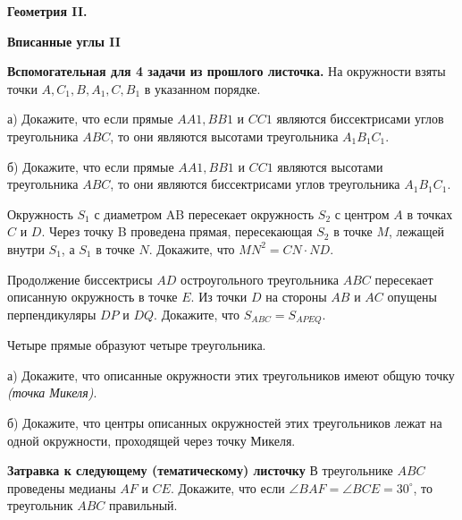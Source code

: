 \centerline{\bf \Huge Геометрия II.}
\centerline{\bf \Huge Вписанные углы II}

\begin{flushright}
        \scriptsize{}
\end{flushright}

\textbf{Вспомогательная для 4 задачи из прошлого листочка.}
На окружности взяты точки $A, C_1, B, A_1, C, B_1$ в указанном
порядке.

а) Докажите, что если прямые $AA1, BB1$ и $CC1$ являются биссектрисами углов треугольника $ABC$, то они являются высотами треугольника $A_1B_1C_1.$

б) Докажите, что если прямые $AA1, BB1$ и $CC1$ являются высотами
треугольника $ABC$, то они являются биссектрисами углов треугольника $A_1B_1C_1.$

Окружность $S_1$ с диаметром AB пересекает окружность $S_2$
с центром $A$ в точках $C$ и $D$. Через точку B проведена прямая,
пересекающая $S_2$ в точке $M$, лежащей внутри $S_1$, а $S_1$ в точке $N$.
Докажите, что $MN^2 = CN \cdot ND.$

Продолжение биссектрисы $AD$ остроугольного треугольника $ABC$ пересекает описанную окружность в точке $E$. Из точки $D$ на стороны $AB$ и $AC$ опущены перпендикуляры $DP$ и $DQ$. Докажите, что $S_{ABC} =S_{APEQ}$.

Четыре прямые образуют четыре треугольника.

а) Докажите, что описанные окружности этих треугольников имеют общую точку \textit{(точка Микеля)}.

б) Докажите, что центры описанных окружностей этих треугольников лежат на одной окружности, проходящей через точку Микеля.

\textbf{Затравка к следующему (тематическому) листочку}
В треугольнике $ABC$ проведены медианы $AF$ и $CE$. Докажите, что если $\angle BAF=\angle BCE = 30^{\circ}$, то треугольник $ABC$ правильный.